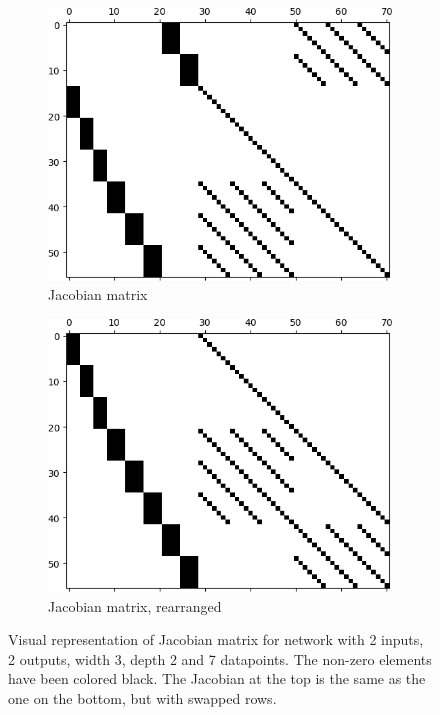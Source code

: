 \begin{figure}[p]
	\centering
	\begin{subfigure}{\textwidth}
	  \centering
	  \includegraphics[width=\textwidth]{jac0.png}
	  \caption{Jacobian matrix}
	  \label{jac}
	\end{subfigure}
	\begin{subfigure}{\textwidth}
	  \centering
	  \includegraphics[width=\textwidth]{jac1.png}
	  \caption{Jacobian matrix, rearranged}
	  \label{jac2}
	\end{subfigure}
	\caption{Visual representation of Jacobian matrix for network with 2 inputs, 2 outputs, width 3, depth 2 and 7 datapoints. The non-zero elements have been colored black. The Jacobian at the top is the same as the one on the bottom, but with swapped rows.}
	\label{jactot}
\end{figure}

